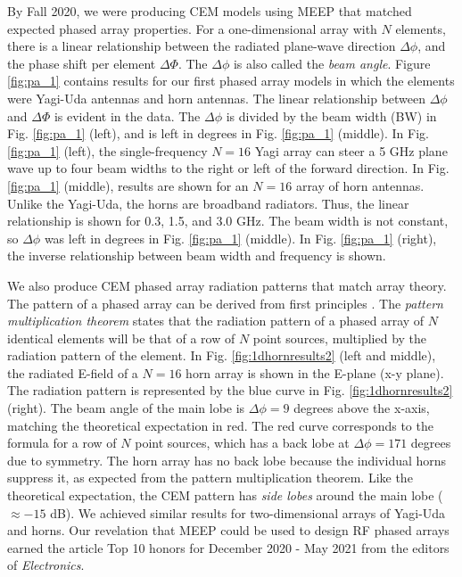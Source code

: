 \documentclass[../../main.tex]{subfiles}
\begin{document}
By Fall 2020, we were producing CEM models using MEEP that matched expected phased array properties.  For a one-dimensional array with $N$ elements, there is a linear relationship between the radiated plane-wave direction $\Delta \phi$, and the phase shift per element $\Delta \Phi$.  The $\Delta \phi$ is also called the \textit{beam angle}.  Figure \ref{fig:pa_1} contains results for our first phased array models in which the elements were Yagi-Uda antennas and horn antennas.  The linear relationship between $\Delta \phi$ and $\Delta \Phi$ is evident in the data.  The $\Delta \phi$ is divided by the beam width (BW) in Fig. \ref{fig:pa_1} (left), and is left in degrees in Fig. \ref{fig:pa_1} (middle).  In Fig. \ref{fig:pa_1} (left), the single-frequency $N=16$ Yagi array can steer a 5 GHz plane wave up to four beam widths to the right or left of the forward direction.  In Fig. \ref{fig:pa_1} (middle), results are shown for an $N=16$ array of horn antennas.  Unlike the Yagi-Uda, the horns are broadband radiators.  Thus, the linear relationship is shown for 0.3, 1.5, and 3.0 GHz.  The beam width is not constant, so $\Delta \phi$ was left in degrees in Fig. \ref{fig:pa_1} (middle).  In Fig. \ref{fig:pa_1} (right), the inverse relationship between beam width and frequency is shown. \\ \vspace{2.5mm}

We also produce CEM phased array radiation patterns that match array theory.  The pattern of a phased array can be derived from first principles \cite{electronics10040415}.  The \textit{pattern multiplication theorem} states that the radiation pattern of a phased array of $N$ identical elements will be that of a row of $N$ point sources, multiplied by the radiation pattern of the element.  In Fig. \ref{fig:1dhornresults2} (left and middle), the radiated E-field of a $N=16$ horn array is shown in the E-plane (x-y plane).  The radiation pattern is represented by the blue curve in Fig. \ref{fig:1dhornresults2} (right).  The beam angle of the main lobe is $\Delta \phi = 9$ degrees above the x-axis, matching the theoretical expectation in red.  The red curve corresponds to the formula for a row of $N$ point sources, which has a back lobe at $\Delta \phi = 171$ degrees due to symmetry.  The horn array has no back lobe because the individual horns suppress it, as expected from the pattern multiplication theorem.  Like the theoretical expectation, the CEM pattern has \textit{side lobes} around the main lobe ($\approx -15$ dB).  We achieved similar results for two-dimensional arrays of Yagi-Uda and horns.  Our revelation that MEEP could be used to design RF phased arrays earned the article Top 10 honors for December 2020 - May 2021 from the editors of \textit{Electronics}. \\ \vspace{2.5mm}
\end{document}
